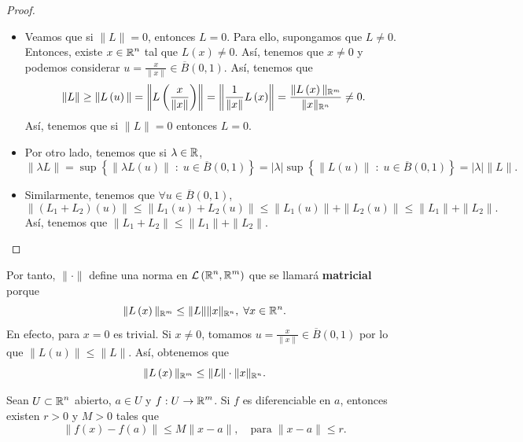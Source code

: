 \begin{proof}
	\begin{itemize}
	\item Veamos que si $\displaystyle \|L\| = 0 $, entonces $\displaystyle L = 0 $. Para ello, supongamos que $\displaystyle L \neq 0 $. Entonces, existe $\displaystyle x \in \mathbb{R}^{n} $ tal que $\displaystyle L\left(x\right) \neq 0 $. Así, tenemos que $\displaystyle x \neq 0 $ y podemos considerar $\displaystyle u = \frac{x}{\|x\|} \in \overline{B}\left(0,1\right) $. Así, tenemos que
\[ \|L\| \geq \|L\left(u\right)\| = \left\|L\left(\frac{x}{\|x\|}\right)\right\| = \left\|\frac{1}{\|x\|}L\left(x\right)\right\| = \frac{\|L\left(x\right)\|_{\mathbb{R}^{m}}}{\|x\|_{\mathbb{R}^{n}}} \neq 0.\]
Así, tenemos que si $\displaystyle \|L\| = 0 $ entonces $\displaystyle L = 0 $. 
\item Por otro lado, tenemos que si $\displaystyle \lambda \in \mathbb{R} $,
\[\|\lambda L\| = \sup \left\{ \|\lambda L\left(u\right)\| \; : \; u \in \overline{B}\left(0,1\right)\right\} = \left|\lambda \right| \sup \left\{ \|L\left(u\right)\| \; : \; u \in \overline{B}\left(0,1\right)\right\} = \left|\lambda \right| \|L\| .\]
\item Similarmente, tenemos que $\displaystyle \forall u \in \overline{B}\left(0,1\right) $,
\[\|\left(L_{1}+L_{2}\right)\left(u\right)\| \leq \|L_{1}\left(u\right) + L_{2}\left(u\right)\| \leq \|L_{1}\left(u\right)\| + \|L_{2}\left(u\right)\| \leq \|L_{1}\| + \|L_{2}\| .\]
Así, tenemos que $\displaystyle \|L_{1} + L_{2} \| \leq \|L_{1}\| + \|L_{2}\| $.
	\end{itemize}
\end{proof}
\begin{observation}
Por tanto, $\displaystyle \| \cdot \| $ define una norma en $\displaystyle \mathcal{L}\left(\mathbb{R}^{n}, \mathbb{R}^{m}\right) $ que se llamará \textbf{matricial} porque 
\[\|L\left(x\right)\|_{\mathbb{R}^{m}} \leq \|L\| \|x\|_{\mathbb{R}^{n}}, \; \forall x \in \mathbb{R}^{n} .\]
En efecto, para $\displaystyle x = 0 $ es trivial. Si $\displaystyle x \neq 0 $, tomamos $\displaystyle u = \frac{x}{\|x\|} \in \overline{B}\left(0,1\right) $ por lo que $\displaystyle \|L\left(u\right)\| \leq \|L\| $. Así, obtenemos que
\[\|L\left(x\right)\|_{\mathbb{R}^{m}} \leq \|L\| \cdot \|x\|_{\mathbb{R}^{n}} .\]
\end{observation}
\begin{prop}
Sean $\displaystyle U \subset \mathbb{R}^{n} $ abierto, $\displaystyle a \in U $ y $\displaystyle f : U \to \mathbb{R}^{m} $. Si $\displaystyle f $ es diferenciable en $\displaystyle a $, entonces existen $\displaystyle r > 0 $ y $\displaystyle M > 0 $ tales que
\[ \|f\left(x\right)-f\left(a\right)\| \leq M \|x-a\|, \quad \text{para} \;  \|x - a\| \leq r .\]
\end{prop}
